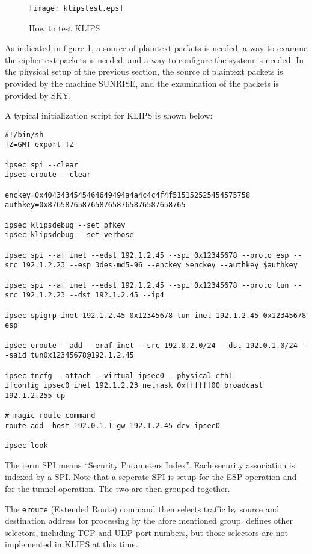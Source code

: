 \begin{figure}
\texttt{[image: klipstest.eps]} 
\caption{How to test KLIPS}
\label{klipstest}
\end{figure}

As indicated in figure \ref{klipstest}, a source of plaintext packets is
needed, a way to examine the ciphertext packets is needed, and a way to
configure the system is needed. In the physical setup of the previous
section, the source of plaintext packets is provided by the machine {\scshape
SUNRISE}, and the examination of the packets is provided by {\scshape SKY}.  

A typical initialization script for KLIPS is shown below:

\begin{verbatim}
#!/bin/sh
TZ=GMT export TZ

ipsec spi --clear
ipsec eroute --clear

enckey=0x4043434545464649494a4a4c4c4f4f515152525454575758
authkey=0x87658765876587658765876587658765

ipsec klipsdebug --set pfkey
ipsec klipsdebug --set verbose

ipsec spi --af inet --edst 192.1.2.45 --spi 0x12345678 --proto esp --src 192.1.2.23 --esp 3des-md5-96 --enckey $enckey --authkey $authkey

ipsec spi --af inet --edst 192.1.2.45 --spi 0x12345678 --proto tun --src 192.1.2.23 --dst 192.1.2.45 --ip4

ipsec spigrp inet 192.1.2.45 0x12345678 tun inet 192.1.2.45 0x12345678 esp 

ipsec eroute --add --eraf inet --src 192.0.2.0/24 --dst 192.0.1.0/24 --said tun0x12345678@192.1.2.45

ipsec tncfg --attach --virtual ipsec0 --physical eth1
ifconfig ipsec0 inet 192.1.2.23 netmask 0xffffff00 broadcast 192.1.2.255 up

# magic route command
route add -host 192.0.1.1 gw 192.1.2.45 dev ipsec0

ipsec look
\end{verbatim}

The term SPI means ``Security Parameters Index''. Each security association
is indexed by a SPI. Note that a seperate SPI is setup for the ESP operation
and for the tunnel operation. The two are then grouped together. 

The {\tt eroute} (Extended Route) command then selects traffic by source and
destination address for processing by the afore mentioned
group. \cite{RFC2401} defines other selectors, including TCP and UDP port
numbers, but those selectors are not implemented in KLIPS at this time.

